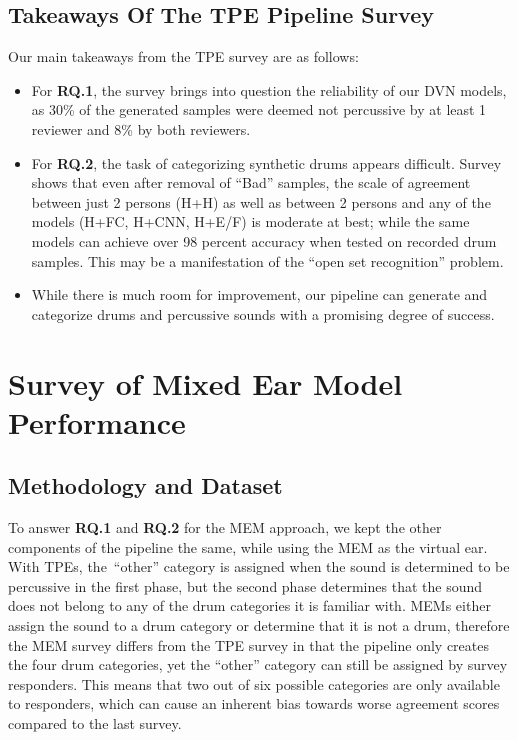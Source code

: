 \documentclass[\main/thesis.tex]{subfiles}
\begin{document}
\subsection{Takeaways Of The TPE Pipeline Survey}
Our main takeaways from the TPE survey are as follows:
\label{survey1_takeaway}
\begin{itemize}
    \item For \textbf{RQ.1}, the survey brings into question the reliability of our DVN models, as 30\% of the generated samples were deemed not percussive by at least 1 reviewer and 8\% by both reviewers. 
    \item For \textbf{RQ.2}, the task of categorizing synthetic drums appears difficult. Survey shows that even after removal of \enquote{Bad} samples, the scale of agreement between just 2 persons (H+H) as well as between 2 persons and any of the models (H+FC, H+CNN, H+E/F) is moderate at best; while the same models can achieve over 98 percent accuracy when tested on recorded drum samples. This may be a manifestation of the \enquote{open set recognition} problem. 
    \item While there is much room for improvement, our pipeline can generate and categorize drums and percussive sounds with a promising degree of success. 
\end{itemize}

 \section{Survey of Mixed Ear Model Performance}
  \subsection{Methodology and Dataset}
  To answer \textbf{RQ.1} and \textbf{RQ.2} for the MEM approach, we kept the other components of the pipeline the same, while using the MEM as the virtual ear. With TPEs, the~\enquote{other} category is assigned when the sound is determined to be percussive in the first phase, but the second phase determines that the sound does not belong to any of the drum categories it is familiar with. MEMs either assign the sound to a drum category or determine that it is not a drum, therefore the MEM survey differs from the TPE survey in that the pipeline only creates the four drum categories, yet the \enquote{other} category can still be assigned by survey responders. This means that two out of six possible categories are only available to responders, which can cause an inherent bias towards worse agreement scores compared to the last survey. 
\end{document}
